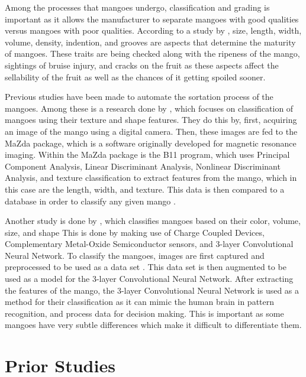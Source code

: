 Among the processes that mangoes undergo, classification and grading is
important as it allows the manufacturer to separate mangoes with good qualities
versus mangoes with poor qualities. According to a study by
\citep{lacap-bruise-2021}, size, length, width, volume, density, indention, and
grooves are aspects that determine the maturity of mangoes. These traits are
being checked along with the ripeness of the mango, sightings of bruise injury,
and cracks on the fruit \citep{lacap-bruise-2021} as these aspects affect the
sellability of the fruit as well as the chances of it getting spoiled sooner.

Previous studies have been made to automate the sortation process of the
mangoes. Among these is a research done by \citet{abbas-mango-2018}, which
focuses on classification of mangoes using their texture and shape features.
They do this by, first, acquiring an image of the mango using a digital camera.
Then, these images are fed to the MaZda package, which is a software originally
developed for magnetic resonance imaging. Within the MaZda package is the B11
program, which uses Principal Component Analysis, Linear Discriminant Analysis,
Nonlinear Discriminant Analysis, and texture classification to extract features
from the mango, which in this case are the length, width, and texture. This data
is then compared to a database in order to classify any given mango
\citep{abbas-mango-2018}.  

Another study is done by \citet{rizwan-iqbal-classification-2022}, which
classifies mangoes based on their color, volume, size, and shape This is done by
making use of Charge Coupled Devices, Complementary Metal-Oxide Semiconductor
sensors, and 3-layer Convolutional Neural Network. To classify the mangoes,
images are first captured and preprocessed to be used as a data set
\citep{rizwan-iqbal-classification-2022}. This data set is then augmented to be
used as a model for the 3-layer Convolutional Neural Network. After extracting
the features of the mango, the 3-layer Convolutional Neural Network is used as a
method for their classification as it can mimic the human brain in pattern
recognition, and process data for decision making. This is important as some
mangoes have very subtle differences which make it difficult to differentiate
them.



\section{Prior Studies}

